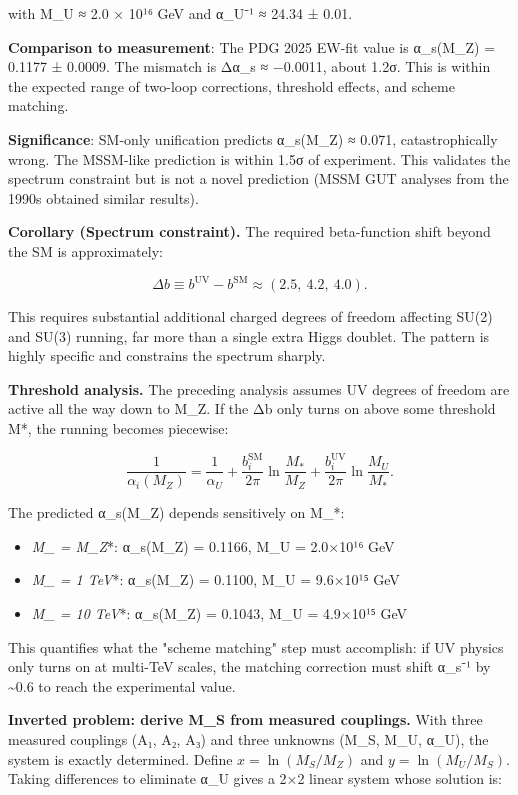 with M\_U ≈ 2.0 × 10¹⁶ GeV and α\_U⁻¹ ≈ 24.34 ± 0.01.

\textbf{Comparison to measurement}: The PDG 2025 EW-fit value is α\_s(M\_Z) = 0.1177 ± 0.0009. The mismatch is Δα\_s ≈ −0.0011, about 1.2σ. This is within the expected range of two-loop corrections, threshold effects, and scheme matching.

\textbf{Significance}: SM-only unification predicts α\_s(M\_Z) ≈ 0.071, catastrophically wrong. The MSSM-like prediction is within 1.5σ of experiment. This validates the spectrum constraint but is not a novel prediction (MSSM GUT analyses from the 1990s obtained similar results).

\textbf{Corollary (Spectrum constraint).} The required beta-function shift beyond the SM is approximately:

\[
\Delta b \equiv b^{\mathrm{UV}} - b^{\mathrm{SM}} \approx (2.5,\ 4.2,\ 4.0).
\]

This requires substantial additional charged degrees of freedom affecting SU(2) and SU(3) running, far more than a single extra Higgs doublet. The pattern is highly specific and constrains the spectrum sharply.

\textbf{Threshold analysis.} The preceding analysis assumes UV degrees of freedom are active all the way down to M\_Z. If the Δb only turns on above some threshold M*, the running becomes piecewise:

\[
\frac{1}{\alpha_i(M_Z)} = \frac{1}{\alpha_U} + \frac{b_i^\mathrm{SM}}{2\pi}
\ln\frac{M_\ast}{M_Z} + \frac{b_i^\mathrm{UV}}{2\pi}\ln\frac{M_U}{M_\ast}.
\]

The predicted α\_s(M\_Z) depends sensitively on M\_*:

\begin{itemize}
\tightlist
\item
  \emph{\emph{M\_} = M\_Z}*: α\_s(M\_Z) = 0.1166, M\_U = 2.0×10¹⁶ GeV
\item
  \emph{\emph{M\_} = 1 TeV}*: α\_s(M\_Z) = 0.1100, M\_U = 9.6×10¹⁵ GeV
\item
  \emph{\emph{M\_} = 10 TeV}*: α\_s(M\_Z) = 0.1043, M\_U = 4.9×10¹⁵ GeV
\end{itemize}

This quantifies what the "scheme matching" step must accomplish: if UV physics only turns on at multi-TeV scales, the matching correction must shift α\_s⁻¹ by \textasciitilde0.6 to reach the experimental value.

\textbf{Inverted problem: derive M\_S from measured couplings.} With three measured couplings (A₁, A₂, A₃) and three unknowns (M\_S, M\_U, α\_U), the system is exactly determined. Define \(x = \ln(M_S/M_Z)\) and \(y = \ln(M_U/M_S)\). Taking differences to eliminate α\_U gives a 2×2 linear system whose solution is:

